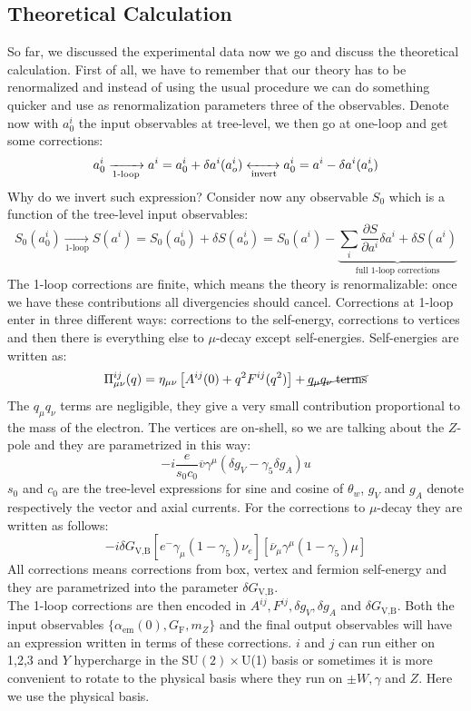 \documentclass[../main.tex]{subfiles}
\begin{document}
\subsection{Theoretical Calculation}
So far, we discussed the experimental data now we go and discuss the theoretical calculation. First of all, we have to remember that our theory has to be renormalized and instead of using the usual procedure we can do something quicker and use as renormalization parameters three of the observables. Denote now with $a^i_0$ the input observables at tree-level, we then go at one-loop and get some corrections:
\[
a_0^i\xrightarrow[\text{1-loop}]{}a^i=a_0^i+\delta a^i(a_o^i)\xleftrightarrow[\text{invert}]{}a_0^i=a^i-\delta a^i(a_o^i)
\]
Why do we invert such expression? Consider now any observable $S_0$ which is a function of the tree-level input observables:
\[
S_0(a_0^i)\xrightarrow[\text{1-loop}]{}S(a^i)=S_0(a_0^i)+\delta S(a_o^i)=S_0(a^i)-\underbrace{\sum_i\frac{\partial S}{\partial a^i}\delta a^i+\delta S(a^i)}_{\text{full 1-loop corrections}}
\]
The 1-loop corrections are finite, which means the theory is renormalizable: once we have these contributions all divergencies should cancel. Corrections at 1-loop enter in three different ways: corrections to the self-energy, corrections to vertices and then there is everything else to $\mu$-decay except self-energies. Self-energies are written as:
\[
\Pi_{\mu\nu}^{ij}(q)=\eta_{\mu\nu}\left[A^{ij}(0)+q^2F^{ij}(q^2)\right]+\cancel{q_\mu q_\nu\;\text{terms}}
\]
The $q_\mu q_\nu$ terms are negligible, they give a very small contribution proportional to the mass of the electron. The vertices are on-shell, so we are talking about the $Z$-pole and they are parametrized in this way:
\[
-i\frac{e}{s_0c_0}\overline{v}\gamma^\mu(\delta g_V-\gamma_5\delta g_A)u
\]
$s_0$ and $c_0$ are the tree-level expressions for sine and cosine of $\theta_w$, $g_V$ and $g_A$ denote respectively the vector and axial currents. For the corrections to $\mu$-decay they are written as follows:
\[
-i\delta G_{\text{V,B}}[e^-\gamma_\mu(1-\gamma_5)\nu_e][\overline{\nu}_\mu\gamma^\mu(1-\gamma_5)\mu]
\]
All corrections means corrections from box, vertex and fermion self-energy and they are parametrized into the parameter $\delta G_{\text{V,B}}$.\\
The 1-loop corrections are then encoded in $A^{ij}, F^{ij}, \delta g_V, \delta g_A$ and $\delta G_{\text{V,B}}$. Both the input observables $\{\alpha_{\text{em}}(0), G_{\text{F}}, m_Z \}$ and the final output observables will have an expression written in terms of these corrections. $i$ and $j$ can run either on 1,2,3 and $Y$ hypercharge in the SU$(2)\times$U(1) basis or sometimes it is more convenient to rotate to the physical basis where they run on $\pm W,\gamma$ and $Z$. Here we use the physical basis.
\end{document}
